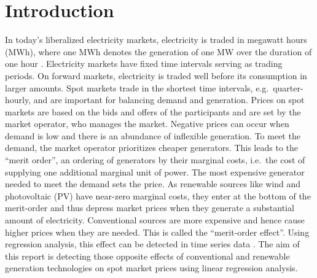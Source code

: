 \documentclass{article}
\begin{document}
\section{Introduction}
In today's liberalized electricity markets, electricity is traded in megawatt hours (MWh), where one MWh denotes the generation of one MW over the duration of one hour \citep{markets_for_electrical_energy}.
Electricity markets have fixed time intervals serving as trading periods.
On forward markets, electricity is traded well before its consumption in larger amounts.
Spot markets trade in the shortest time intervals, e.g.\ quarter-hourly, and are important for balancing demand and generation. %
Prices on spot markets are based on the bids and offers of the participants and are set by the market operator, who manages the market.
Negative prices can occur when demand is low and there is an abundance of inflexible generation.
To meet the demand, the market operator prioritizes cheaper generators.
This leads to the \enquote{merit order}, an ordering of generators by their marginal costs, i.e.\ the cost of supplying one additional marginal unit of power.
The most expensive generator needed to meet the demand sets the price.
As renewable sources like wind and photovoltaic (PV) have near-zero marginal costs, they enter at the bottom of the merit-order and thus depress market prices when they generate a substantial amount of electricity.
Conventional sources are more expensive and hence cause higher prices when they are needed.
This is called the \enquote{merit-order effect}.
Using regression analysis, this effect can be detected in time series data \citep{merit_order_effect_renewable_generation}.
The aim of this report is detecting those opposite effects of conventional and renewable generation technologies on spot market prices using linear regression analysis.
\end{document}
